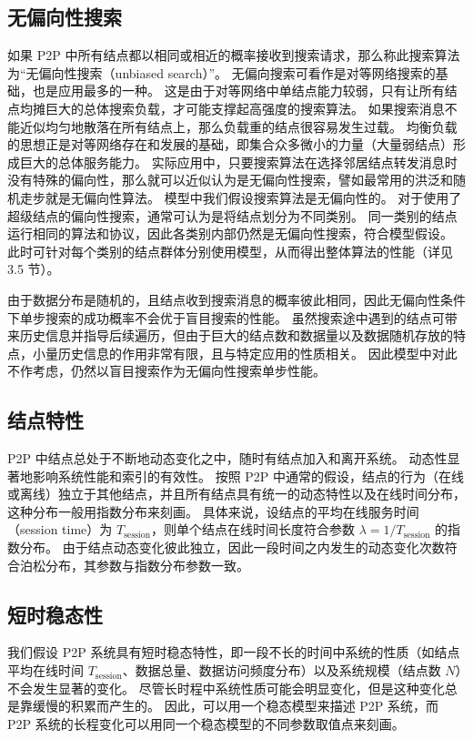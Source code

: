 \documentclass[degree=doctor]{thuthesis}
\begin{document}
\subsection{无偏向性搜索}

如果 P2P 中所有结点都以相同或相近的概率接收到搜索请求，那么称此搜索算法为“无偏向性搜索（unbiased search）”。
无偏向搜索可看作是对等网络搜索的基础，也是应用最多的一种。
这是由于对等网络中单结点能力较弱，只有让所有结点均摊巨大的总体搜索负载，才可能支撑起高强度的搜索算法。
如果搜索消息不能近似均匀地散落在所有结点上，那么负载重的结点很容易发生过载。
均衡负载的思想正是对等网络存在和发展的基础，即集合众多微小的力量（大量弱结点）形成巨大的总体服务能力。
实际应用中，只要搜索算法在选择邻居结点转发消息时没有特殊的偏向性，那么就可以近似认为是无偏向性搜索，譬如最常用的洪泛和随机走步就是无偏向性算法。
模型中我们假设搜索算法是无偏向性的。
对于使用了超级结点的偏向性搜索，通常可认为是将结点划分为不同类别。
同一类别的结点运行相同的算法和协议，因此各类别内部仍然是无偏向性搜索，符合模型假设。
此时可针对每个类别的结点群体分别使用模型，从而得出整体算法的性能（详见 3.5 节）。

由于数据分布是随机的，且结点收到搜索消息的概率彼此相同，因此无偏向性条件下单步搜索的成功概率不会优于盲目搜索的性能。
虽然搜索途中遇到的结点可带来历史信息并指导后续遍历，但由于巨大的结点数和数据量以及数据随机存放的特点，小量历史信息的作用非常有限，且与特定应用的性质相关。
因此模型中对此不作考虑，仍然以盲目搜索作为无偏向性搜索单步性能。


\subsection{结点特性}

P2P 中结点总处于不断地动态变化之中，随时有结点加入和离开系统。
动态性显著地影响系统性能和索引的有效性。
按照 P2P 中通常的假设，结点的行为（在线或离线）独立于其他结点，并且所有结点具有统一的动态特性以及在线时间分布，这种分布一般用指数分布来刻画。
具体来说，设结点的平均在线服务时间（session time）为 $T_{\text{session}}$，则单个结点在线时间长度符合参数 $\lambda = 1/T_{\text{session}}$ 的指数分布。
由于结点动态变化彼此独立，因此一段时间之内发生的动态变化次数符合泊松分布，其参数与指数分布参数一致。


\subsection{短时稳态性}

我们假设 P2P 系统具有短时稳态特性，即一段不长的时间中系统的性质（如结点平均在线时间 $T_{\text{session}}$、数据总量、数据访问频度分布）以及系统规模（结点数 $N$）不会发生显著的变化。
尽管长时程中系统性质可能会明显变化，但是这种变化总是靠缓慢的积累而产生的。
因此，可以用一个稳态模型来描述 P2P 系统，而 P2P 系统的长程变化可以用同一个稳态模型的不同参数取值点来刻画。
\end{document}
